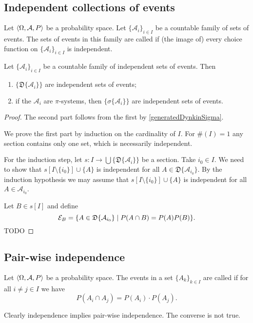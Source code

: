 \subsection{Independent collections of events}
\begin{definition}
Let $\left\langle \Omega, \mathcal{A}, P \right\rangle$ be a probability space. Let $\{\mathcal{A}_i\}_{i\in I}$ be a countable family of sets of events. The sets of events in this family are called  if (the image of) every choice function on $\{\mathcal{A}_i\}_{i\in I}$ is independent.
\end{definition}

\begin{proposition}
Let $\{\mathcal{A}_i\}_{i\in I}$ be a countable family of independent sets of events. Then
\begin{enumerate}
\item $\{\mathfrak{D}\{\mathcal{A}_i\}\}$ are independent sets of events;
\item if the $\mathcal{A}_i$ are $\pi$-systems, then $\{\sigma\{\mathcal{A}_i\}\}$ are independent sets of events.
\end{enumerate}
\end{proposition}
\begin{proof}
The second part follows from the first by \ref{generatedDynkinSigma}.

We prove the first part by induction on the cardinality of $I$. For $\#(I) = 1$ any section contains only one set, which is necessarily independent.

For the induction step, let $s: I \to \bigcup \{\mathfrak{D}\{\mathcal{A}_i\}\}$ be a section. Take $i_0\in I$. We need to show that $s[I\setminus \{i_0\}]\cup \{A\}$ is independent for all $A\in \mathfrak{D}\{\mathcal{A}_{i_0}\}$. By the induction hypothesis we may assume that $s[I\setminus \{i_0\}]\cup \{A\}$ is independent for all $A\in \mathcal{A}_{i_0}$.

Let $B\in s[I]$ and define 
\[ \mathcal{E}_B = \setbuilder{A\in \mathfrak{D}\{\mathcal{A}_{i_0}\}}{P(A\cap B) = P(A)P(B)}. \]
TODO
\end{proof}

\subsection{Pair-wise independence}
\begin{definition}
Let $\left\langle \Omega, \mathcal{A}, P \right\rangle$ be a probability space. The events in a set $\{A_k\}_{k\in I}$ are called  if for all $i\neq j \in I$ we have
\[ P\left(A_i \cap A_j\right) = P(A_i)\cdot P(A_j). \]
\end{definition}
Clearly independence implies pair-wise independence. The converse is not true.

